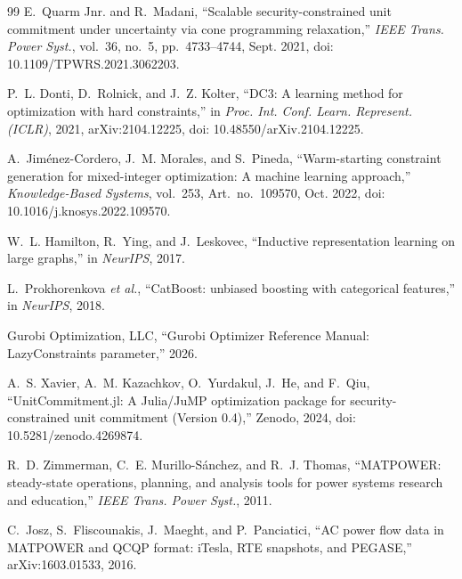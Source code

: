 \documentclass[runningheads]{llncs}
\begin{document}
\begin{thebibliography}{99}
E.~Quarm Jnr. and R.~Madani, ``Scalable security-constrained unit commitment under uncertainty via cone programming relaxation,'' \emph{IEEE Trans. Power Syst.}, vol.~36, no.~5, pp.~4733--4744, Sept. 2021, doi: 10.1109/TPWRS.2021.3062203.

P.~L. Donti, D.~Rolnick, and J.~Z. Kolter, ``DC3: A learning method for optimization with hard constraints,'' in \emph{Proc. Int. Conf. Learn. Represent. (ICLR)}, 2021, arXiv:2104.12225, doi: 10.48550/arXiv.2104.12225.

A.~Jim\'enez-Cordero, J.~M. Morales, and S.~Pineda, ``Warm-starting constraint generation for mixed-integer optimization: A machine learning approach,'' \emph{Knowledge-Based Systems}, vol.~253, Art.~no.~109570, Oct. 2022, doi: 10.1016/j.knosys.2022.109570.

W.~L. Hamilton, R.~Ying, and J.~Leskovec, ``Inductive representation learning on large graphs,'' in \emph{NeurIPS}, 2017.

L.~Prokhorenkova \emph{et al.}, ``CatBoost: unbiased boosting with categorical features,'' in \emph{NeurIPS}, 2018.

Gurobi Optimization, LLC, ``Gurobi Optimizer Reference Manual: LazyConstraints parameter,'' 2026.

A.~S. Xavier, A.~M. Kazachkov, O.~Yurdakul, J.~He, and F.~Qiu, ``UnitCommitment.jl: A Julia/JuMP optimization package for security-constrained unit commitment (Version 0.4),'' Zenodo, 2024, doi: 10.5281/zenodo.4269874.

R.~D. Zimmerman, C.~E. Murillo-S\'anchez, and R.~J. Thomas, ``MATPOWER: steady-state operations, planning, and analysis tools for power systems research and education,'' \emph{IEEE Trans. Power Syst.}, 2011.

C.~Josz, S.~Fliscounakis, J.~Maeght, and P.~Panciatici, ``AC power flow data in MATPOWER and QCQP format: iTesla, RTE snapshots, and PEGASE,'' arXiv:1603.01533, 2016.

\end{thebibliography}
\end{document}
